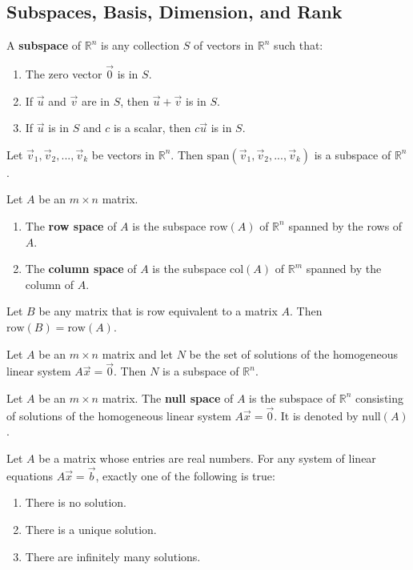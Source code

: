 \documentclass{article}
\begin{document}
\subsection{Subspaces, Basis, Dimension, and Rank}
\begin{definition}
	A \textbf{subspace} of $\mathbb{R}^n$ is any collection $S$ of vectors in $\mathbb{R}^n$ such that:
	\begin{enumerate}
		\item The zero vector $\vec 0$ is in $S$.
		\item If $\vec u$ and $\vec v$ are in $S$, then $\vec u + \vec v$ is in $S$.
		\item If $\vec u$ is in $S$ and $c$ is a scalar, then $c\vec u$ is in $S$.
	\end{enumerate}
\end{definition}
\begin{theorem}
	Let $\vec v_1, \vec v_2, ..., \vec v_k$ be vectors in $\mathbb{R}^n$. Then $\text{span}(\vec v_1, \vec v_2, ..., \vec v_k)$ is a subspace of $\mathbb{R}^n$.
\end{theorem}
\begin{definition}
	Let $A$ be an $m\times n$ matrix.
	\begin{enumerate}
		\item The \textbf{row space} of $A$ is the subspace $\text{row}(A)$ of $\mathbb{R}^n$ spanned by the rows of $A$.
		\item The \textbf{column space} of $A$ is the subspace $\text{col}(A)$ of $\mathbb{R}^m$ spanned by the column of $A$.
	\end{enumerate}
\end{definition}
\begin{theorem}
	Let $B$ be any matrix that is row equivalent to a matrix $A$. Then $\text{row}(B)=\text{row}(A)$.
\end{theorem}
\begin{theorem}
	Let $A$ be an $m\times n$ matrix and let $N$ be the set of solutions of the homogeneous linear system $A\vec x=\vec 0$. Then $N$ is a subspace of $\mathbb{R}^n$.
\end{theorem}
\begin{definition}
	Let $A$ be an $m\times n$ matrix. The \textbf{null space} of $A$ is the subspace of $\mathbb{R}^n$ consisting of solutions of the homogeneous linear system $A\vec x = \vec 0$. It is denoted by $\text{null}(A)$.
\end{definition}
\begin{theorem}
	Let $A$ be a matrix whose entries are real numbers. For any system of linear equations $A\vec x =\vec b$, exactly one of the following is true:
	\begin{enumerate}
		\item There is no solution.
		\item There is a unique solution.
		\item There are infinitely many solutions.
	\end{enumerate}
\end{theorem}
\end{document}
